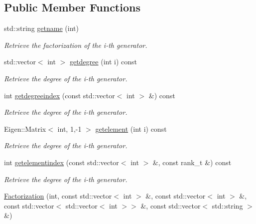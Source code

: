 \subsection*{Public Member Functions}
\begin{DoxyCompactItemize}
\item 
std\+::string \hyperlink{classMackey_1_1Factorization_ac5088227511baaaec1f62802b75d3a9e}{getname} (int)
\begin{DoxyCompactList}\small\item\em Retrieve the factorization of the i-\/th generator. \end{DoxyCompactList}\item 
std\+::vector$<$ int $>$ \hyperlink{classMackey_1_1Factorization_a273e9318c0a5eacacd584474f93ffe4a}{getdegree} (int i) const
\begin{DoxyCompactList}\small\item\em Retrieve the degree of the i-\/th generator. \end{DoxyCompactList}\item 
int \hyperlink{classMackey_1_1Factorization_ab90f461af3418417970d4be8682e965d}{getdegreeindex} (const std\+::vector$<$ int $>$ \&) const
\begin{DoxyCompactList}\small\item\em Retrieve the degree of the i-\/th generator. \end{DoxyCompactList}\item 
Eigen\+::\+Matrix$<$ int, 1,-\/1 $>$ \hyperlink{classMackey_1_1Factorization_a6e15f1fb3623685326255f7badf7eee9}{getelement} (int i) const
\begin{DoxyCompactList}\small\item\em Retrieve the degree of the i-\/th generator. \end{DoxyCompactList}\item 
int \hyperlink{classMackey_1_1Factorization_a5217ad8ca4aaa13b900adda77893249b}{getelementindex} (const std\+::vector$<$ int $>$ \&, const rank\+\_\+t \&) const
\begin{DoxyCompactList}\small\item\em Retrieve the degree of the i-\/th generator. \end{DoxyCompactList}\item 
\hyperlink{classMackey_1_1Factorization_af1b07ab5021c4e51698c4cd3fbb85422}{Factorization} (int, const std\+::vector$<$ int $>$ \&, const std\+::vector$<$ int $>$ \&, const std\+::vector$<$ std\+::vector$<$ int $>$$>$ \&, const std\+::vector$<$ std\+::string $>$ \&)
$$
\end{DoxyCompactItemize}

